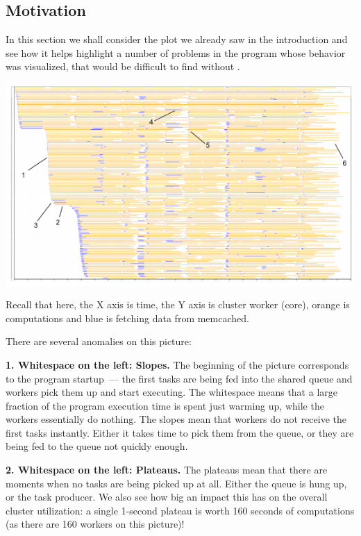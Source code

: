 \documentclass{article}
\begin{document}
\pagebreak
\subsection{Motivation}
\label{sec:splot-motivation}
In this section we shall consider the plot we already saw in the introduction and see how it helps highlight a number of problems in the program whose behavior was visualized, that would be difficult to find without \splot{}.

{
\center
\includegraphics[width=\textwidth]{pics/splot/splot-main-example-analyzed.png}
}

Recall that here, the X axis is time, the Y axis is cluster worker (core), orange is computations and blue is fetching data from memcached.

There are several anomalies on this picture:

\vspace{3mm}

\textbf{1. Whitespace on the left: Slopes.} The beginning of the picture corresponds to the program startup~--- the first tasks are being fed into the shared queue and workers pick them up and start executing. The whitespace means that a large fraction of the program execution time is spent just warming up, while the workers essentially do nothing. The slopes mean that workers do not receive the first tasks instantly. Either it takes time to pick them from the queue, or they are being fed to the queue not quickly enough.

\textbf{2. Whitespace on the left: Plateaus.} The plateaus mean that there are moments when no tasks are being picked up at all. Either the queue is hung up, or the task producer. We also see how big an impact this has on the overall cluster utilization: a single 1-second plateau is worth 160 seconds of computations (as there are 160 workers on this picture)!
\end{document}
